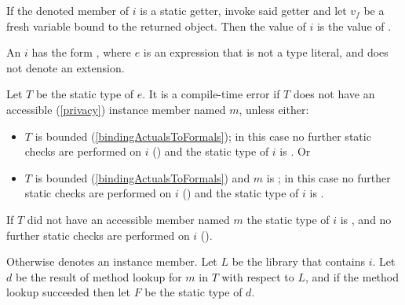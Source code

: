 \documentclass[makeidx]{article}
\begin{document}
{\LMHash{}%
If the denoted member of $i$ is a static getter,
invoke said getter and let $v_f$ be
a fresh variable bound to the returned object.
Then the value of $i$ is the value of
.
\EndCase

\LMHash{}%
An 
$i$ has the form
,
where $e$ is an expression that is not a type literal,
and does not denote an extension.


\LMHash{}%
Let $T$ be the static type of $e$.
It is a compile-time error if $T$ does not have an accessible
(\ref{privacy})
instance member named $m$, unless either:
\begin{itemize}
\item
  $T$ is \DYNAMIC{} bounded
  (\ref{bindingActualsToFormals});
  in this case no further static checks are performed on $i$
  ()
  and the static type of $i$ is \DYNAMIC.
  Or
\item
  $T$ is \FUNCTION{} bounded
  (\ref{bindingActualsToFormals})
  and $m$ is \CALL;
  in this case no further static checks are performed on $i$
  ()
  and the static type of $i$ is \DYNAMIC.
\end{itemize}

\LMHash{}%
If $T$ did not have an accessible member named $m$
the static type of $i$ is \DYNAMIC,
and no further static checks are performed on $i$
().

\LMHash{}%
Otherwise  denotes an instance member.
Let $L$ be the library that contains $i$.
Let $d$ be the result of method lookup for $m$ in $T$ with respect to $L$,
and if the method lookup succeeded then let $F$ be the static type of $d$.

}
\end{document}
